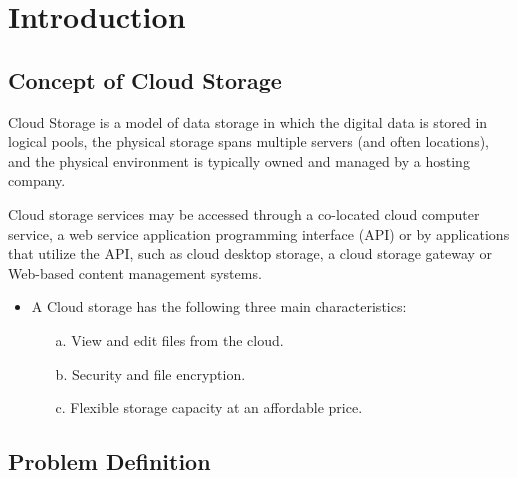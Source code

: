 \chapter{Introduction}
\newpage

\section{Concept of Cloud Storage}

\hspace{0.6cm} Cloud Storage is a model of data storage in which the digital data is stored in logical pools, the physical storage spans multiple servers (and often locations), and the physical environment is typically owned and managed by a hosting company.

\vspace{0.2cm} Cloud storage services may be accessed through a co-located cloud computer service, a web service application programming interface (API) or by applications that utilize the API, such as cloud desktop storage, a cloud storage gateway or Web-based content management systems. 

\begin{itemize}
\item A Cloud storage has the following three main characteristics: 
    \begin{itemize}

    \item[a.] View and edit files from the cloud.
    \item[b.] Security and file encryption.
    \item[c.] Flexible storage capacity at an affordable price.
    \end{itemize}
\end{itemize}


\section{Problem Definition}

